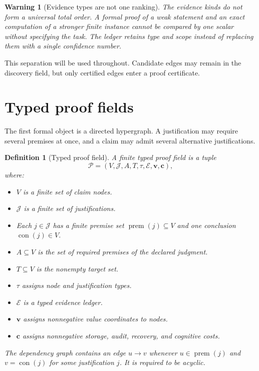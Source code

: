 \documentclass[11pt,oneside]{article}
\theoremstyle{komorebiplain}
\theoremstyle{komorebidefinition}
\newtheorem{definition}[theorem]{Definition}
\theoremstyle{komorebiremark}
\newtheorem{warning}[theorem]{Warning}
\newcommand{\Pcal}{\mathcal P}
\newcommand{\Jcal}{\mathcal J}
\newcommand{\Ecal}{\mathcal E}
\begin{document}
\begin{warning}[Evidence types are not one ranking]
\label{res:2:2}
The evidence kinds do not form a universal total order. A formal proof of a weak statement and an exact computation of a stronger finite instance cannot be compared by one scalar without specifying the task. The ledger retains type and scope instead of replacing them with a single confidence number.
\end{warning}

This separation will be used throughout. Candidate edges may remain in the discovery field, but only certified edges enter a proof certificate.


\section{Typed proof fields}
\label{sec:old3}

The first formal object is a directed hypergraph. A justification may require several premises at once, and a claim may admit several alternative justifications.

\begin{definition}[Typed proof field]
\label{res:3:1}
A finite typed proof field is a tuple
\[
\Pcal=(V,\Jcal,A,T,\tau,\Ecal,\mathbf v,\mathbf c),
\]
where:
\begin{itemize}
\item $V$ is a finite set of claim nodes.
\item $\Jcal$ is a finite set of justifications.
\item Each $j\in\Jcal$ has a finite premise set $\operatorname{prem}(j)\subseteq V$ and one conclusion $\operatorname{con}(j)\in V$.
\item $A\subseteq V$ is the set of required premises of the declared judgment.
\item $T\subseteq V$ is the nonempty target set.
\item $\tau$ assigns node and justification types.
\item $\Ecal$ is a typed evidence ledger.
\item $\mathbf v$ assigns nonnegative value coordinates to nodes.
\item $\mathbf c$ assigns nonnegative storage, audit, recovery, and cognitive costs.
\end{itemize}
The dependency graph contains an edge $u\to v$ whenever $u\in\operatorname{prem}(j)$ and $v=\operatorname{con}(j)$ for some justification $j$. It is required to be acyclic.
\end{definition}
\end{document}
